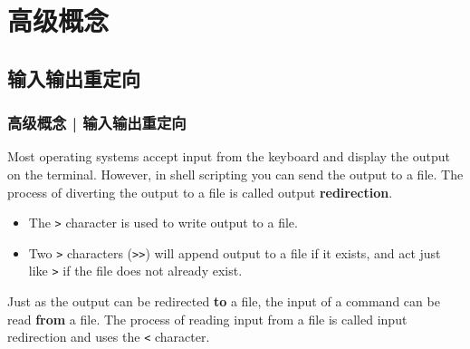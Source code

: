 \section{高级概念}
\subsection{输入输出重定向}
\begin{frame}[fragile]
  \frametitle{高级概念 | 输入输出重定向}
  Most operating systems accept input from the keyboard and display the output on the terminal. However, in shell scripting you can send the output to a file. The process of diverting the output to a file is called output \textbf{redirection}.
  \begin{itemize}
    \item The \verb|>| character is used to write output to a file.
    \item Two \verb|>| characters (\verb|>>|) will append output to a file if it exists, and act just like \verb|>| if the file does not already exist.
  \end{itemize}
  Just as the output can be redirected \textbf{to} a file, the input of a command can be read \textbf{from} a file. The process of reading input from a file is called input redirection and uses the \verb|<| character.
\end{frame}

